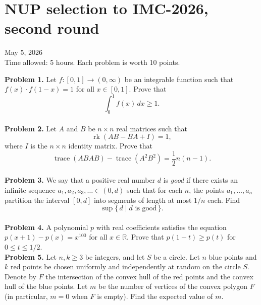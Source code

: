 \documentclass{article}
\newcommand{\R}{\mathbb{R}}
\begin{document}
\pagestyle{plain}

\section*{NUP selection to IMC-2026, second round}

\begin{center}
May 5, 2026 \\
Time allowed: 5 hours. Each problem is worth 10 points.
\end{center}

\textbf{Problem 1.} %
Let \( f : [0, 1] \to (0, \infty) \) be an integrable function such that \( f(x) \cdot f(1 - x) = 1 \) for all \( x \in [0, 1] \).
Prove that
\[
\int_{0}^{1} f(x)\, dx \geq 1.
\]
\\

\textbf{Problem 2.} %
Let \( A \) and \( B \) be \( n \times n \) real matrices such that
\[
\operatorname{rk}(AB - BA + I) = 1,
\]
where \( I \) is the \( n \times n \) identity matrix. Prove that
\[
\operatorname{trace}(ABAB) - \operatorname{trace}(A^2 B^2) = \frac{1}{2} n(n - 1).
\]
\\

\textbf{Problem 3.} %
We say that a positive real number \( d \) is \emph{good} if there exists an infinite sequence
\( a_1, a_2, a_3, \ldots \in (0, d) \) such that for each \( n \), the points \( a_1, \ldots, a_n \) partition
the interval \( [0, d] \) into segments of length at most \( 1/n \) each. Find
\[
\sup \{\, d \mid d \text{ is good}\,\}.
\]
\\

\textbf{Problem 4.} %
A polynomial \( p \) with real coefficients satisfies the equation \( p(x + 1) - p(x) = x^{100} \) for all \( x \in \R \).
Prove that \( p(1 - t) \geq p(t) \) for \( 0 \leq t \leq 1/2 \).
\\

\textbf{Problem 5.} %
Let \( n, k \geq 3 \) be integers, and let \( S \) be a circle. Let \( n \) blue points and \( k \) red points be chosen
uniformly and independently at random on the circle \( S \). Denote by \( F \) the intersection of the convex hull
of the red points and the convex hull of the blue points. Let \( m \) be the number of vertices of the convex polygon \( F \)
(in particular, \( m = 0 \) when \( F \) is empty). Find the expected value of \( m \).
\end{document}
